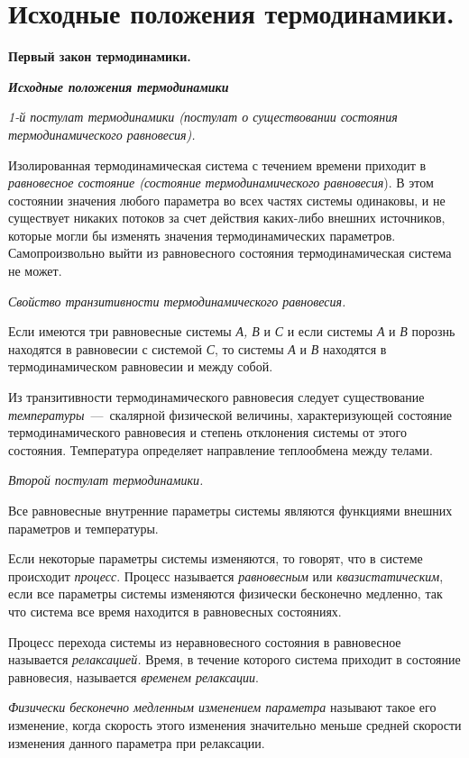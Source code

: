 \chapter{Исходные положения термодинамики.}

\textbf{Первый закон термодинамики.}

\emph{\textbf{Исходные положения термодинамики}}

\emph{1-й постулат термодинамики (постулат о существовании состояния
термодинамического равновесия).}

Изолированная термодинамическая система с течением времени приходит в
\emph{равновесное состояние (состояние термодинамического равновесия}).
В этом состоянии значения любого параметра во всех частях системы
одинаковы, и не существует никаких потоков за счет действия каких-либо
внешних источников, которые могли бы изменять значения термодинамических
параметров. Самопроизвольно выйти из равновесного состояния
термодинамическая система не может.

\emph{Свойство транзитивности термодинамического равновесия.}

Если имеются три равновесные системы \emph{А, В} и \emph{С} и если
системы \emph{А} и \emph{В} порознь находятся в равновесии с системой
\emph{С}, то системы \emph{А} и \emph{В} находятся в термодинамическом
равновесии и между собой.

Из транзитивности термодинамического равновесия следует существование
\emph{температуры}~---~скалярной физической величины, характеризующей
состояние термодинамического равновесия и степень отклонения системы от
этого состояния. Температура определяет направление теплообмена между
телами.

\emph{Второй постулат термодинамики.}

Все равновесные внутренние параметры системы являются функциями внешних
параметров и температуры.

Если некоторые параметры системы изменяются, то говорят, что в системе
происходит \emph{процесс}. Процесс называется \emph{равновесным} или
\emph{квазистатическим}, если все параметры системы изменяются физически
бесконечно медленно, так что система все время находится в равновесных
состояниях.

Процесс перехода системы из неравновесного состояния в равновесное
называется \emph{релаксацией.} Время, в течение которого система
приходит в состояние равновесия, называется \emph{временем релаксации}.

\emph{Физически бесконечно медленным изменением параметра} называют
такое его изменение, когда скорость этого изменения значительно меньше
средней скорости изменения данного параметра при релаксации.

